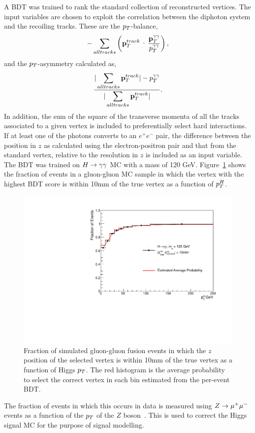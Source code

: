 A BDT was trained to rank the standard collection of reconstructed vertices.
The input variables are chosen to exploit the correlation between the diphoton system and the recoiling tracks.
These are the $p_{T}$-balance,
\begin{eqnarray}
	-\sum_{all tracks} \left(\ptvec^{track}\cdot \frac{\displaystyle \ptggvec}{\displaystyle \ptgg}\right), 
\end{eqnarray}
and the $p_{T}$-asymmetry calculated as,
\begin{eqnarray}
	\frac{\displaystyle |\sum_{all tracks} \mathbf{p}_{T}^{track}| - p_{T}^{\gamma\gamma} }{ \displaystyle|\sum_{all tracks} \mathbf{p}_{T}^{track}|}.
\end{eqnarray}
In addition, the sum of the square of the transverse momenta of all the tracks associated 
to a given vertex is included to preferentially select hard interactions. If at least one of the 
photons converts to an $e^{+}e^{-}$ pair, the difference between the position in $z$ as calculated 
using the electron-positron pair and that from the standard vertex, relative to the resolution in $z$
is included as an input variable. The BDT was trained on $H\rightarrow\gamma\gamma$ MC with a mass of 120 GeV. 
Figure~\ref{fig:vtxeffhmc} shows the fraction of events in a gluon-gluon MC sample in which 
the vertex with the highest BDT score is within 10mm of the true vertex as a function of $p_{T}^{H}$.
\begin{figure}
\includegraphics[width=.8\textwidth]{hgg7TeV/generalPlots/vtxEffHMC.pdf}
\caption{Fraction of simulated gluon-gluon fusion events in which the $z$ position of the selected vertex
is within 10mm of the true vertex as a function of Higgs $p_{T}$. The red histogram is the average 
probability to select the correct vertex in each bin estimated from the per-event BDT.}
\label{fig:vtxeffhmc}
\end{figure} 
The fraction of events in which this occurs in data is measured using $Z\rightarrow \mu^{+}\mu^{-}$ events
as a function of the $p_{T}$ of the $Z$ boson~\citep{AN-12-048}. This is used to correct the Higgs signal MC for 
the purpose of signal modelling. 

